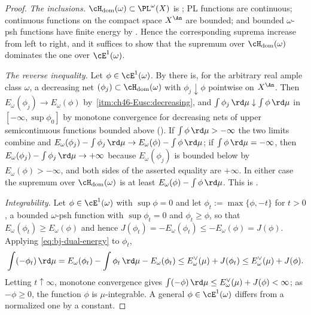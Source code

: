 \begin{proof}
\emph{The inclusions.}  $\cH_{\mathrm{dom}}(\omega)\subset\PL^\omega(X)$
is ; PL functions are continuous; continuous functions
on the compact space $X^{\An}$ are bounded; and bounded $\omega$-psh
functions have finite energy by .  Hence the
corresponding suprema increase from left to right, and it suffices to show
that the supremum over $\cH_{\mathrm{dom}}(\omega)$ dominates the one
over $\cE^1(\omega)$.

\emph{The reverse inequality.}  Let $\phi\in\cE^1(\omega)$.  By
 there is, for the arbitrary real ample
class $\omega$, a decreasing net
$(\phi_j)\subset\cH_{\mathrm{dom}}(\omega)$ with
$\phi_j\downarrow\phi$ pointwise on $X^{\An}$.  Then
$E_\omega(\phi_j)\to E_\omega(\phi)$ by
\,\cref{itm:ch46-Eusc:decreasing}, and
$\int\phi_j\,\rd\mu\downarrow\int\phi\,\rd\mu$ in
$[-\infty,\sup\phi_0]$ by monotone convergence for decreasing nets of
upper semicontinuous functions bounded above
().  If $\int\phi\,\rd\mu>-\infty$ the two
limits combine and
$E_\omega(\phi_j)-\int\phi_j\,\rd\mu\to E_\omega(\phi)-\int\phi\,\rd\mu$;
if $\int\phi\,\rd\mu=-\infty$, then
$E_\omega(\phi_j)-\int\phi_j\,\rd\mu\to+\infty$ because
$E_\omega(\phi_j)$ is bounded below by $E_\omega(\phi)>-\infty$, and
both sides of the asserted equality are $+\infty$.  In either case the
supremum over $\cH_{\mathrm{dom}}(\omega)$ is at least
$E_\omega(\phi)-\int\phi\,\rd\mu$.  This is
\cite[Proposition~9.4]{BJ22}.

\emph{Integrability.}  Let $\phi\in\cE^1(\omega)$ with $\sup\phi=0$ and
let $\phi_t:=\max\{\phi,-t\}$ for $t>0$, a bounded $\omega$-psh
function with $\sup\phi_t=0$ and $\phi_t\ge\phi$, so that
$E_\omega(\phi_t)\ge E_\omega(\phi)$ and hence
$J(\phi_t)=-E_\omega(\phi_t)\le-E_\omega(\phi)=J(\phi)$.  Applying
\eqref{eq:bj-dual-energy} to $\phi_t$,
\[
 \int(-\phi_t)\,\rd\mu
 =E_\omega(\phi_t)-\int\phi_t\,\rd\mu-E_\omega(\phi_t)
 \le E^\vee_\omega(\mu)+J(\phi_t)\le E^\vee_\omega(\mu)+J(\phi).
\]
Letting $t\uparrow\infty$, monotone convergence gives
$\int(-\phi)\,\rd\mu\le E^\vee_\omega(\mu)+J(\phi)<\infty$; as
$-\phi\ge0$, the function $\phi$ is $\mu$-integrable.  A general
$\phi\in\cE^1(\omega)$ differs from a normalized one by a constant.
\end{proof}

